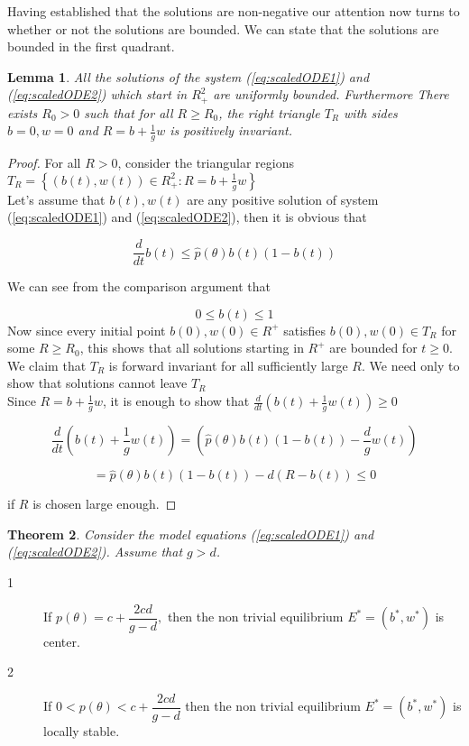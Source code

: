 \documentclass[review,authoryear]{elsarticle}
\newtheorem{theorem}{Theorem}[section]
\newtheorem{lemma}[theorem]{Lemma}
\begin{document}
Having established that the solutions are non-negative our attention
now turns to whether or not the solutions are bounded. We can state
that the solutions are bounded in the first quadrant.
\begin{lemma} \label{mm}
All the solutions of the system (\ref{eq:scaledODE1}) and (\ref{eq:scaledODE2}) which start in $R_{+}^{2}$ are
uniformly bounded. Furthermore There exists $R_{0}>0$  such that for all $R\geq R_{0}$, the right
triangle $T_{R}$ with sides $b=0, w=0$ and $R=b+\frac{1}{g}w $ is positively invariant.
\end{lemma}

\begin{proof}
For all $R>0$, consider the triangular regions $T_{R}=\left\{ \left(b(t),w(t)\right) \in R_{+}^{2}:R=b+\frac{1}{g}w\right\} $\\
Let's assume that $b(t),w(t)$ are any positive solution of system (\ref{eq:scaledODE1}) and (\ref{eq:scaledODE2}),
then it is obvious that

$$\frac{d}{dt}b(t)\leq \hat{p}\left( \theta \right) b(t)\left( 1-b(t)\right) $$

We can see from the comparison argument that

$$0\leq b(t)\leq 1$$
Now since every initial point $b(0),w(0)\in R^{+}$ satisfies $b(0),w(0)\in T_{R}$ for some $R\geq R_{0}$, this shows that all solutions starting in $R^{+}$ are bounded for $t\geq 0$.\\
We claim that $T_{R}$ is forward invariant for all sufficiently large $R.$ We
need only to show that solutions cannot leave $T_{R}$\\
Since $R=b+\frac{1}{g}w $, 
it is enough to show that $\frac{d}{dt}\left( b(t)+\frac{1}{g}w(t)\right)\geq 0$

$$\frac{d}{dt}\left( b(t)+\frac{1}{g}w(t)\right)
=\left( \hat{p}\left( \theta \right) b(t)\left( 1-b(t)\right) -\frac{d}{g}%
w\left( t\right) \right) $$

$$ =\hat{p}\left( \theta \right) b(t)\left(
1-b(t)\right) -d\left( R-b(t)\right) \leq 0$$

if $R$ is chosen large enough.
\end{proof}

\begin{theorem}
   Consider the model equations (\ref{eq:scaledODE1}) and
  (\ref{eq:scaledODE2}). Assume that  $g>d$.
 
\end{theorem}

\begin{description}
\item[1]  If $%
p(\theta )=c+\dfrac{2cd}{g-d},$ then the non trivial equilibrium $%
E^{\ast }=(b^{\ast },w^{\ast })$ is center.

\item[2] If $0<p(\theta )<c+\dfrac{2cd}{g-d}$ then the non trivial
equilibrium $E^{\ast }=(b^{\ast },w^{\ast })$ is locally stable.
\end{description}
\end{document}
